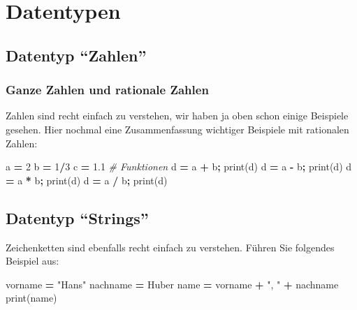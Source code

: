 \documentclass[
  oneside]{book}
\newenvironment{Shaded}{\begin{snugshade}}{\end{snugshade}}
\newcommand{\BuiltInTok}[1]{#1}
\newcommand{\CommentTok}[1]{\textcolor[rgb]{0.56,0.35,0.01}{\textit{#1}}}
\newcommand{\DecValTok}[1]{\textcolor[rgb]{0.00,0.00,0.81}{#1}}
\newcommand{\FloatTok}[1]{\textcolor[rgb]{0.00,0.00,0.81}{#1}}
\newcommand{\NormalTok}[1]{#1}
\newcommand{\OperatorTok}[1]{\textcolor[rgb]{0.81,0.36,0.00}{\textbf{#1}}}
\newcommand{\StringTok}[1]{\textcolor[rgb]{0.31,0.60,0.02}{#1}}
\begin{document}
\hypertarget{datentypen}{%
\section{Datentypen}\label{datentypen}}

\hypertarget{datentyp-zahlen}{%
\subsection{Datentyp ``Zahlen''}\label{datentyp-zahlen}}

\hypertarget{ganze-zahlen-und-rationale-zahlen}{%
\subsubsection{Ganze Zahlen und rationale Zahlen}\label{ganze-zahlen-und-rationale-zahlen}}

Zahlen sind recht einfach zu verstehen, wir haben ja oben schon einige Beispiele gesehen. Hier nochmal eine Zusammenfassung wichtiger Beispiele mit rationalen Zahlen: 

\begin{Shaded}
\begin{Highlighting}[]
\NormalTok{a }\OperatorTok{=} \DecValTok{2}
\NormalTok{b }\OperatorTok{=} \DecValTok{1}\OperatorTok{/}\DecValTok{3}
\NormalTok{c }\OperatorTok{=} \FloatTok{1.1}
\CommentTok{\# Funktionen}
\NormalTok{d }\OperatorTok{=}\NormalTok{ a }\OperatorTok{+}\NormalTok{ b}\OperatorTok{;} \BuiltInTok{print}\NormalTok{(d)}
\NormalTok{d }\OperatorTok{=}\NormalTok{ a }\OperatorTok{{-}}\NormalTok{ b}\OperatorTok{;} \BuiltInTok{print}\NormalTok{(d)}
\NormalTok{d }\OperatorTok{=}\NormalTok{ a }\OperatorTok{*}\NormalTok{ b}\OperatorTok{;} \BuiltInTok{print}\NormalTok{(d)}
\NormalTok{d }\OperatorTok{=}\NormalTok{ a }\OperatorTok{/}\NormalTok{ b}\OperatorTok{;} \BuiltInTok{print}\NormalTok{(d)}
\end{Highlighting}
\end{Shaded}

\hypertarget{datentyp-strings}{%
\subsection{Datentyp ``Strings''}\label{datentyp-strings}}

Zeichenketten sind ebenfalls recht einfach zu verstehen. Führen Sie folgendes Beispiel aus:

\begin{Shaded}
\begin{Highlighting}[]
\NormalTok{vorname }\OperatorTok{=} \StringTok{"Hans"}
\NormalTok{nachname }\OperatorTok{=} \StringTok{\textquotesingle{}Huber\textquotesingle{}}
\NormalTok{name }\OperatorTok{=}\NormalTok{ vorname }\OperatorTok{+} \StringTok{", "} \OperatorTok{+}\NormalTok{ nachname}
\BuiltInTok{print}\NormalTok{(name)}
\end{Highlighting}
\end{Shaded}
\end{document}
